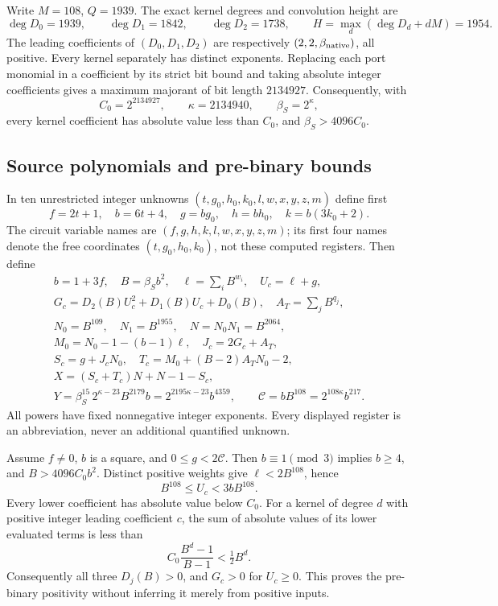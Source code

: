 Write $M=108$, $Q=1939$. The exact kernel degrees and convolution height are
\[
 \deg D_0=1939,\qquad\deg D_1=1842,\qquad\deg D_2=1738,\qquad
 H=\max_d(\deg D_d+dM)=1954.
\]
The leading coefficients of $(D_0,D_1,D_2)$ are respectively $(2,2,\beta_{\rm native})$, all positive. Every kernel separately has distinct exponents. Replacing each
port monomial in a coefficient by its strict bit bound and taking absolute
integer coefficients gives a maximum majorant of bit length $2134927$.
Consequently, with
\[
 C_0=2^{2134927},\qquad\kappa=2134940,\qquad\beta_S=2^\kappa,
\]
every kernel coefficient has absolute value less than $C_0$, and
$\beta_S>4096C_0$.

\subsection{Source polynomials and pre-binary bounds}

In ten unrestricted integer unknowns $(t,g_0,h_0,k_0,l,w,x,y,z,m)$ define first
\[f=2t+1,\quad b=6t+4,\quad g=bg_0,\quad h=bh_0,\quad k=b(3k_0+2).\]
The circuit variable names are $(f,g,h,k,l,w,x,y,z,m)$; its first four names denote the free coordinates $(t,g_0,h_0,k_0)$, not these computed registers. Then define
\begin{gather*}
 b=1+3f,\quad B=\beta_S b^2,\quad\ell=\sum_i B^{w_i},\quad U_c=\ell+g,\\
 G_c=D_2(B)U_c^2+D_1(B)U_c+D_0(B),\quad A_T=\sum_j B^{q_j},\\
 N_0=B^{109},\quad N_1=B^{1955},\quad N=N_0N_1=B^{2064},\\
 M_0=N_0-1-(b-1)\ell,\quad J_c=2G_c+A_T,\\
 S_c=g+J_cN_0,\quad T_c=M_0+(B-2)A_TN_0-2,\\
 X=(S_c+T_c)N+N-1-S_c,\\
 Y=\beta_S^{15}\,2^{\kappa-23}B^{2179}b
   =2^{2195\kappa-23}b^{4359},\qquad
 \mathcal C=bB^{108}=2^{108\kappa}b^{217}.
\end{gather*}
All powers have fixed nonnegative integer exponents. Every displayed
register is an abbreviation, never an additional quantified unknown.

Assume $f\ne0$, $b$ is a square, and $0\le g<2\mathcal C$.
Then $b\equiv1\pmod3$ implies $b\ge4$, and $B>4096C_0b^2$.
Distinct positive weights give $\ell<2B^{108}$, hence
\[
 B^{108}\le U_c<3bB^{108}.
\]
Every lower coefficient has absolute value below $C_0$. For a kernel of degree $d$ with positive integer leading coefficient $c$, the sum of absolute values of its lower evaluated terms is less than
\[
 C_0\frac{B^d-1}{B-1}<\tfrac12B^d.
\]
Consequently all three $D_j(B)>0$, and $G_c>0$ for $U_c\ge0$. This proves the pre-binary positivity without inferring it merely from positive inputs.

